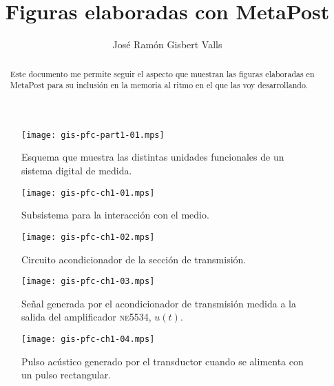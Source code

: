 \documentclass[a4paper,12pt]				{article}
\title{Figuras elaboradas con MetaPost}
\author{José Ramón Gisbert Valls}
\begin{document}
\maketitle{}

\begin{abstract}
	Este documento me permite seguir el aspecto que muestran las
	figuras elaboradas en MetaPost para su inclusión en la memoria al
	ritmo en el que las voy desarrollando.
\end{abstract}

\listoffigures

\begin{figure}
	\begin{center}
		\texttt{[image: gis-pfc-part1-01.mps]}
	\end{center}
	\caption[Sistema digital de medida]{Esquema que muestra las
	distintas unidades funcionales de un sistema digital de medida.}
	\label{fig:digmeasstm}
\end{figure}

\begin{figure}
	\begin{center}
		\texttt{[image: gis-pfc-ch1-01.mps]}
	\end{center}
	\caption[Subsistema para la interacción con el medio]{Subsistema
	para la interacción con el medio.}
	\label{fig:submedium}
\end{figure}

\begin{figure}
	\begin{center}
		\texttt{[image: gis-pfc-ch1-02.mps]}
	\end{center}
	\caption[Circuito acondicionador de la sección de
	transmisión]{Circuito acondicionador de la sección de transmisión.}
	\label{fig:txconditioner}
\end{figure}

\begin{figure}
	\begin{center}
		\texttt{[image: gis-pfc-ch1-03.mps]}
	\end{center}
	\caption[Señal a la salida del amplificador \textsc{ne5534},
	$u(t)$]{Señal generada por el acondicionador de transmisión medida
	a la salida del amplificador \textsc{ne5534}, $u(t)$.}
	\label{fig:txacvo}
\end{figure}

\clearpage

\begin{figure}
	\begin{center}
		\texttt{[image: gis-pfc-ch1-04.mps]}
	\end{center}
	\caption[Pulso acústico generado por el transductor]{Pulso acústico
	generado por el transductor cuando se alimenta con un pulso
	rectangular.}
	\label{fig:pulse}
\end{figure}
\end{document}
